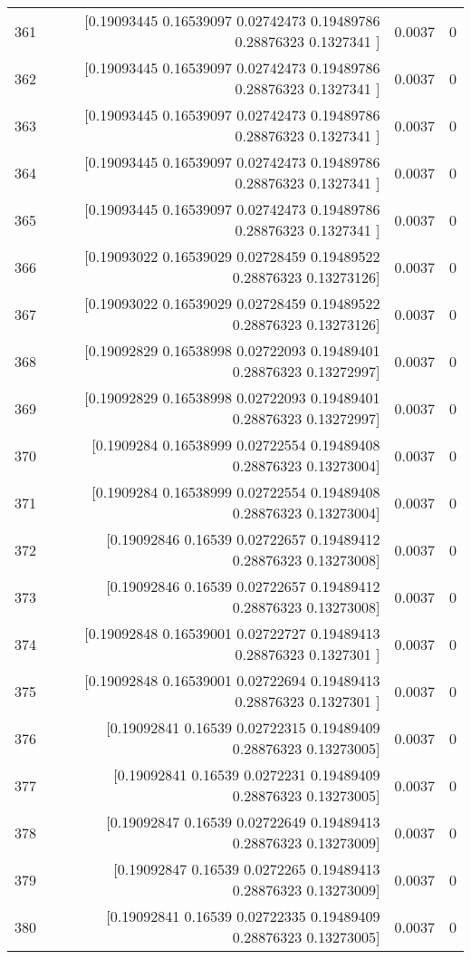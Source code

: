 \begin{longtable}{lrrr}
361 & [0.19093445 0.16539097 0.02742473 0.19489786 0.28876323 0.1327341 ] & 0.0037 & 0 \\
362 & [0.19093445 0.16539097 0.02742473 0.19489786 0.28876323 0.1327341 ] & 0.0037 & 0 \\
363 & [0.19093445 0.16539097 0.02742473 0.19489786 0.28876323 0.1327341 ] & 0.0037 & 0 \\
364 & [0.19093445 0.16539097 0.02742473 0.19489786 0.28876323 0.1327341 ] & 0.0037 & 0 \\
365 & [0.19093445 0.16539097 0.02742473 0.19489786 0.28876323 0.1327341 ] & 0.0037 & 0 \\
366 & [0.19093022 0.16539029 0.02728459 0.19489522 0.28876323 0.13273126] & 0.0037 & 0 \\
367 & [0.19093022 0.16539029 0.02728459 0.19489522 0.28876323 0.13273126] & 0.0037 & 0 \\
368 & [0.19092829 0.16538998 0.02722093 0.19489401 0.28876323 0.13272997] & 0.0037 & 0 \\
369 & [0.19092829 0.16538998 0.02722093 0.19489401 0.28876323 0.13272997] & 0.0037 & 0 \\
370 & [0.1909284  0.16538999 0.02722554 0.19489408 0.28876323 0.13273004] & 0.0037 & 0 \\
371 & [0.1909284  0.16538999 0.02722554 0.19489408 0.28876323 0.13273004] & 0.0037 & 0 \\
372 & [0.19092846 0.16539    0.02722657 0.19489412 0.28876323 0.13273008] & 0.0037 & 0 \\
373 & [0.19092846 0.16539    0.02722657 0.19489412 0.28876323 0.13273008] & 0.0037 & 0 \\
374 & [0.19092848 0.16539001 0.02722727 0.19489413 0.28876323 0.1327301 ] & 0.0037 & 0 \\
375 & [0.19092848 0.16539001 0.02722694 0.19489413 0.28876323 0.1327301 ] & 0.0037 & 0 \\
376 & [0.19092841 0.16539    0.02722315 0.19489409 0.28876323 0.13273005] & 0.0037 & 0 \\
377 & [0.19092841 0.16539    0.0272231  0.19489409 0.28876323 0.13273005] & 0.0037 & 0 \\
378 & [0.19092847 0.16539    0.02722649 0.19489413 0.28876323 0.13273009] & 0.0037 & 0 \\
379 & [0.19092847 0.16539    0.0272265  0.19489413 0.28876323 0.13273009] & 0.0037 & 0 \\
380 & [0.19092841 0.16539    0.02722335 0.19489409 0.28876323 0.13273005] & 0.0037 & 0 \\

\end{longtable}
